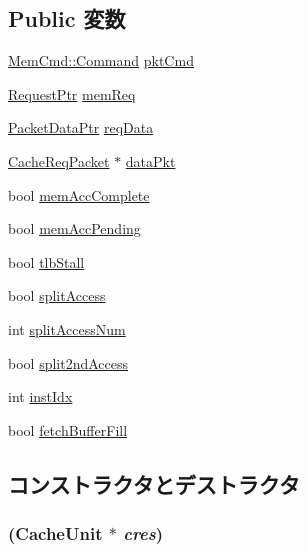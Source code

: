 \subsection*{Public 変数}
\begin{DoxyCompactItemize}
\item 
\hyperlink{classMemCmd_a2afce0a47a93eee73a314d53e4890153}{MemCmd::Command} \hyperlink{classCacheRequest_ad7ffb57e2a652479b7a4377f7db03e30}{pktCmd}
\item 
\hyperlink{classRequest}{RequestPtr} \hyperlink{classCacheRequest_a5520eb2f7c2cf4b0e109d6ffd6d2d053}{memReq}
\item 
\hyperlink{packet_8hh_ae85a9de970f801a77a1ad88ee2b39ea2}{PacketDataPtr} \hyperlink{classCacheRequest_a3c85036decf244a8280a1ca878e81b34}{reqData}
\item 
\hyperlink{classCacheReqPacket}{CacheReqPacket} $\ast$ \hyperlink{classCacheRequest_a9b285fe0ef029e701369de8a6e7ed341}{dataPkt}
\item 
bool \hyperlink{classCacheRequest_af160acb6943c568a0acf532b050ef6a4}{memAccComplete}
\item 
bool \hyperlink{classCacheRequest_aa3141bc66d01fac90a0d8ef27257a26e}{memAccPending}
\item 
bool \hyperlink{classCacheRequest_ac4aba9c9cde03862a74bf4131670be4b}{tlbStall}
\item 
bool \hyperlink{classCacheRequest_a0586264c1ffcc69c90953f324c0c1dcb}{splitAccess}
\item 
int \hyperlink{classCacheRequest_a8116e141a645f1d034f40e047d3a3ec1}{splitAccessNum}
\item 
bool \hyperlink{classCacheRequest_a69bff60f1682c6b24a1e023449dc8599}{split2ndAccess}
\item 
int \hyperlink{classCacheRequest_a65152017e4eb674a60e1b6c374b2df6f}{instIdx}
\item 
bool \hyperlink{classCacheRequest_a2b7f1ab2876d712b08792af773ace20e}{fetchBufferFill}
\end{DoxyCompactItemize}


\subsection{コンストラクタとデストラクタ}
\hypertarget{classCacheRequest_a5bf039e41366d603b045c6472310d78a}{
\subsubsection[{CacheRequest}]{ ({\bf CacheUnit} $\ast$ {\em cres})}}
\label{classCacheRequest_a5bf039e41366d603b045c6472310d78a}



